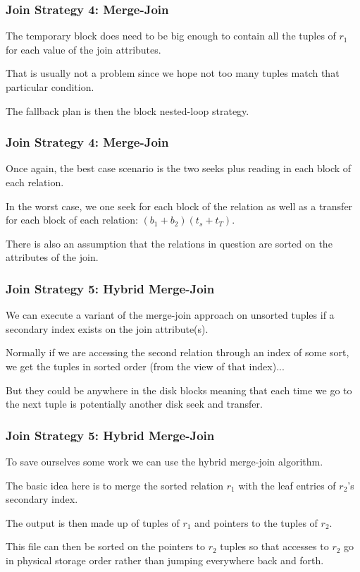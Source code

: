 \begin{frame}
\frametitle{Join Strategy 4: Merge-Join}

The temporary block does need to be big enough to contain all the tuples of $r_{1}$ for each value of the join attributes. 

That is usually not a problem since we hope not too many tuples match that particular condition. 


The fallback plan is then the block nested-loop strategy.


\end{frame}


\begin{frame}
\frametitle{Join Strategy 4: Merge-Join}

Once again, the best case scenario is the two seeks plus reading in each block of each relation. 

In the worst case, we one seek for each block of the relation as well as a transfer for each block of each relation: $(b_{1} + b_{2})(t_{s} + t_{T})$.

There is also an assumption that the relations in question are sorted on the attributes of the join. 


\end{frame}

\begin{frame}
\frametitle{Join Strategy 5: Hybrid Merge-Join}

We can execute a variant of the merge-join approach on unsorted tuples if a secondary index exists on the join attribute(s). 

Normally if we are accessing the second relation through an index of some sort, we get the tuples in sorted order (from the view of that index)...

But they could be anywhere in the disk blocks meaning that each time we go to the next tuple is potentially another disk seek and transfer.

\end{frame}

\begin{frame}
\frametitle{Join Strategy 5: Hybrid Merge-Join}

To save ourselves some work we can use the hybrid merge-join algorithm.

The basic idea here is to merge the sorted relation $r_{1}$ with the leaf entries of $r_{2}$'s secondary index. 

The output is then made up of tuples of $r_{1}$ and pointers to the tuples of $r_{2}$. 

This file can then be sorted on the pointers to $r_{2}$ tuples so that accesses to $r_{2}$ go in physical storage order rather than jumping everywhere back and forth.

\end{frame}


